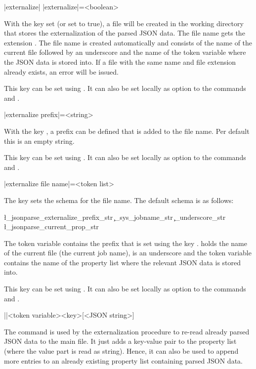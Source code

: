 \documentclass[a4paper]{article}
\begin{document}
{{\begin{macrodef}
|externalize|
|externalize|={<boolean>}
\end{macrodef}
With the key  set (or set to true), a file will be created in the working directory that stores the externalization of the parsed JSON data. The file name gets the extension . The file name is created automatically and consists of the name of the current file followed by an underscore and the name of the token variable where the JSON data is stored into. If a file with the same name and file extension already exists, an error will be issued.

This key can be set using \macro{\JSONParseSet}. It can also be set locally as option to the commands \macro{\JSONParse} and \macro{\JSONParseFromFile}.

\begin{macrodef}
|externalize prefix|={<string>}
\end{macrodef}
With the key , a prefix can be defined that is added to the file name. Per default this is an empty string.

This key can be set using \macro{\JSONParseSet}. It can also be set locally as option to the commands \macro{\JSONParse} and \macro{\JSONParseFromFile}.

\begin{macrodef}
|externalize file name|={<token list>}
\end{macrodef}
The key  sets the schema for the file name. The default schema is as follows:

\begin{codeexample}
\l_jsonparse_externalize_prefix_str \c_sys_jobname_str
  \c_underscore_str \l_jsonparse_current_prop_str
\end{codeexample}

The token variable  contains the prefix that is set using the key .  holds the name of the current file (the current job name),  is an underscore and the token variable  contains the name of the property list where the relevant JSON data is stored into.

This key can be set using \macro{\JSONParseSet}. It can also be set locally as option to the commands \macro{\JSONParse} and \macro{\JSONParseFromFile}.

\begin{macrodef}
|\JSONParsePut|{<token variable>}{<key>}[<JSON string>]
\end{macrodef}
The command \macro{\JSONParsePut} is used by the externalization procedure to re-read already parsed JSON data to the main file. It just adds a key-value pair to the property list (where the value part is read as string). Hence, it can also be used to append more entries to an already existing property list containing parsed JSON data.

}}
\end{document}
